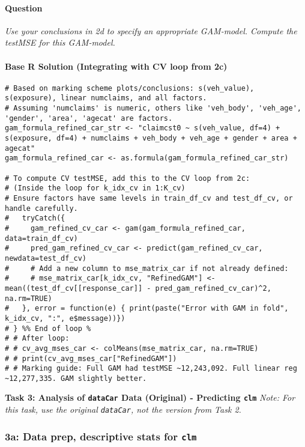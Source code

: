 \documentclass[12pt,a4paper]{article}
\newcommand{\Robject}[1]{\texttt{#1}} %
\newcommand{\Rcode}[1]{\texttt{#1}} %
\begin{document}
        \paragraph{Question}
        \textit{Use your conclusions in 2d to specify an appropriate GAM-model. Compute the testMSE for this GAM-model.}
        \paragraph{Base R Solution (Integrating with CV loop from 2c)}
\begin{lstlisting}[]
# Based on marking scheme plots/conclusions: s(veh_value), s(exposure), linear numclaims, and all factors.
# Assuming 'numclaims' is numeric, others like 'veh_body', 'veh_age', 'gender', 'area', 'agecat' are factors.
gam_formula_refined_car_str <- "claimcst0 ~ s(veh_value, df=4) + s(exposure, df=4) + numclaims + veh_body + veh_age + gender + area + agecat"
gam_formula_refined_car <- as.formula(gam_formula_refined_car_str)

# To compute CV testMSE, add this to the CV loop from 2c:
# (Inside the loop for k_idx_cv in 1:K_cv)
# Ensure factors have same levels in train_df_cv and test_df_cv, or handle carefully.
#   tryCatch({
#     gam_refined_cv_car <- gam(gam_formula_refined_car, data=train_df_cv)
#     pred_gam_refined_cv_car <- predict(gam_refined_cv_car, newdata=test_df_cv)
#     # Add a new column to mse_matrix_car if not already defined:
#     # mse_matrix_car[k_idx_cv, "RefinedGAM"] <- mean((test_df_cv[[response_car]] - pred_gam_refined_cv_car)^2, na.rm=TRUE)
#   }, error = function(e) { print(paste("Error with GAM in fold", k_idx_cv, ":", e$message))})
# } %% End of loop %
# # After loop: 
# # cv_avg_mses_car <- colMeans(mse_matrix_car, na.rm=TRUE)
# # print(cv_avg_mses_car["RefinedGAM"])
# # Marking guide: Full GAM had testMSE ~12,243,092. Full linear reg ~12,277,335. GAM slightly better.
\end{lstlisting}

\vspace{1em}
\textbf{\Large Task 3: Analysis of \Robject{dataCar} Data (Original) - Predicting \Robject{clm}}
\vspace{0.5em}
    \textit{Note: For this task, use the original \Rcode{dataCar}, not the version from Task 2.}

    \subsubsection{3a: Data prep, descriptive stats for \Rcode{clm}}
\end{document}
